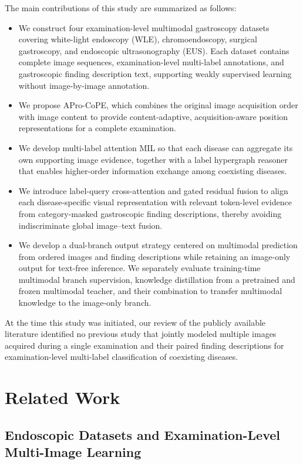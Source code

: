 \documentclass[Afour,sagev,times]{sagej}
\begin{document}
The main contributions of this study are summarized as follows:
\begin{itemize}
    \item We construct four examination-level multimodal gastroscopy datasets covering white-light endoscopy (WLE), chromoendoscopy, surgical gastroscopy, and endoscopic ultrasonography (EUS). Each dataset contains complete image sequences, examination-level multi-label annotations, and gastroscopic finding description text, supporting weakly supervised learning without image-by-image annotation.
    \item We propose APro-CoPE, which combines the original image acquisition order with image content to provide content-adaptive, acquisition-aware position representations for a complete examination.
    \item We develop multi-label attention MIL so that each disease can aggregate its own supporting image evidence, together with a label hypergraph reasoner that enables higher-order information exchange among coexisting diseases.
    \item We introduce label-query cross-attention and gated residual fusion to align each disease-specific visual representation with relevant token-level evidence from category-masked gastroscopic finding descriptions, thereby avoiding indiscriminate global image--text fusion.
    \item We develop a dual-branch output strategy centered on multimodal prediction from ordered images and finding descriptions while retaining an image-only output for text-free inference. We separately evaluate training-time multimodal branch supervision, knowledge distillation from a pretrained and frozen multimodal teacher, and their combination to transfer multimodal knowledge to the image-only branch.
\end{itemize}

At the time this study was initiated, our review of the publicly available literature identified no previous study that jointly modeled multiple images acquired during a single examination and their paired finding descriptions for examination-level multi-label classification of coexisting diseases.

\section{Related Work}

\subsection{Endoscopic Datasets and Examination-Level Multi-Image Learning}
\end{document}
